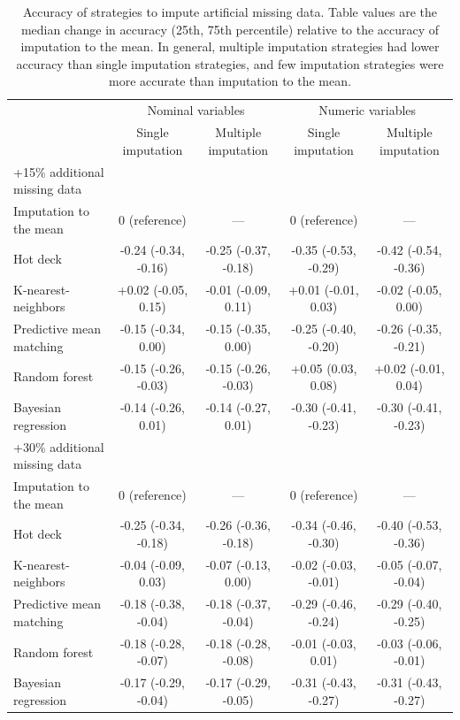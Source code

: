 \documentclass{article}
\begin{document}
\clearpage

\begin{table} 
 \caption{Accuracy of strategies to impute artificial missing data. Table values are the median change in accuracy (25th, 75th percentile) relative to the accuracy of imputation to the mean. In general, multiple imputation strategies had lower accuracy than single imputation strategies, and few imputation strategies were more accurate than imputation to the mean.} 
\label{tbl_impute_accuracy} 
 
\begin{tabular}{lcccc}
\toprule
& \multicolumn{2}{c}{Nominal variables} & \multicolumn{2}{c}{Numeric variables} \\ 
 \cmidrule(lr){2-3}\cmidrule(lr){4-5}
 & Single imputation & Multiple imputation & Single imputation & Multiple imputation \\ 
\midrule
\multicolumn{1}{l}{+15\% additional missing data} \\ 
\midrule
Imputation to the mean & 0 (reference) & --- & 0 (reference) & --- \\ 
Hot deck & -0.24 (-0.34, -0.16) & -0.25 (-0.37, -0.18) & -0.35 (-0.53, -0.29) & -0.42 (-0.54, -0.36) \\ 
K-nearest-neighbors & +0.02 (-0.05, 0.15) & -0.01 (-0.09, 0.11) & +0.01 (-0.01, 0.03) & -0.02 (-0.05, 0.00) \\ 
Predictive mean matching & -0.15 (-0.34, 0.00) & -0.15 (-0.35, 0.00) & -0.25 (-0.40, -0.20) & -0.26 (-0.35, -0.21) \\ 
Random forest & -0.15 (-0.26, -0.03) & -0.15 (-0.26, -0.03) & +0.05 (0.03, 0.08) & +0.02 (-0.01, 0.04) \\ 
Bayesian regression & -0.14 (-0.26, 0.01) & -0.14 (-0.27, 0.01) & -0.30 (-0.41, -0.23) & -0.30 (-0.41, -0.23) \\ 
\midrule
\multicolumn{1}{l}{+30\% additional missing data} \\ 
\midrule
Imputation to the mean & 0 (reference) & --- & 0 (reference) & --- \\ 
Hot deck & -0.25 (-0.34, -0.18) & -0.26 (-0.36, -0.18) & -0.34 (-0.46, -0.30) & -0.40 (-0.53, -0.36) \\ 
K-nearest-neighbors & -0.04 (-0.09, 0.03) & -0.07 (-0.13, 0.00) & -0.02 (-0.03, -0.01) & -0.05 (-0.07, -0.04) \\ 
Predictive mean matching & -0.18 (-0.38, -0.04) & -0.18 (-0.37, -0.04) & -0.29 (-0.46, -0.24) & -0.29 (-0.40, -0.25) \\ 
Random forest & -0.18 (-0.28, -0.07) & -0.18 (-0.28, -0.08) & -0.01 (-0.03, 0.01) & -0.03 (-0.06, -0.01) \\ 
Bayesian regression & -0.17 (-0.29, -0.04) & -0.17 (-0.29, -0.05) & -0.31 (-0.43, -0.27) & -0.31 (-0.43, -0.27) \\ 
\bottomrule
\end{tabular} 
 \end{table}
\end{document}
